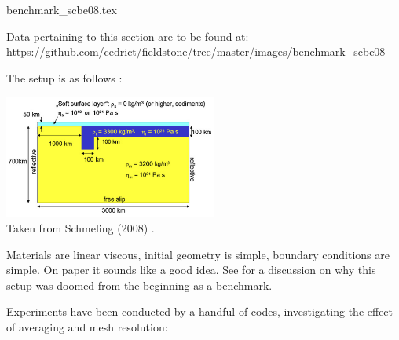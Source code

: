 \begin{flushright} {\tiny {\color{gray} benchmark\_scbe08.tex}} \end{flushright}

\vspace{0.5cm}
\begin{flushright}
Data pertaining to this section are to be found at:
\url{https://github.com/cedrict/fieldstone/tree/master/images/benchmark_scbe08}
\end{flushright}
\vspace{0.5cm}

The setup is as follows :

\begin{center}
\includegraphics[width=7cm]{images/benchmark_scbe08/setup}\\
{\captionfont Taken from Schmeling \etal (2008) \cite{scbe08}.}
\end{center}

Materials are linear viscous, initial geometry is simple, 
boundary conditions are simple. On paper it sounds like a 
good idea. See  for a discussion on why this 
setup was doomed from the beginning as a benchmark.  

Experiments have been conducted by a handful of codes, 
investigating the effect of averaging and mesh resolution:

